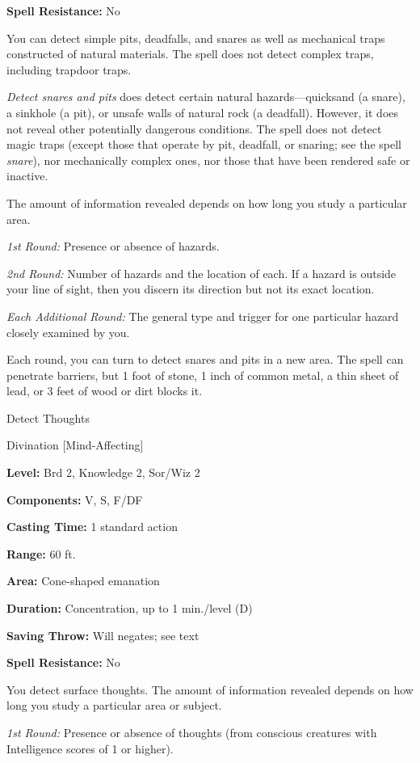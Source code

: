 \documentclass{article}
\begin{document}
\textbf{Spell Resistance:} No

You can detect simple pits, deadfalls, and snares as well as mechanical traps constructed 
of natural materials. The spell does not detect complex traps, including trapdoor 
traps.

\textit{Detect snares and pits }does detect certain natural hazards---quicksand 
(a snare), a sinkhole (a pit), or unsafe walls of natural rock (a deadfall). However, 
it does not reveal other potentially dangerous conditions. The spell does not detect 
magic traps (except those that operate by pit, deadfall, or snaring; see the spell 
\textit{snare}), nor mechanically complex ones, nor those that have been rendered 
safe or inactive.

The amount of information revealed depends on how long you study a particular area.

\textit{1st Round: }Presence or absence of hazards.

\textit{2nd Round: }Number of hazards and the location of each. If a hazard is 
outside your line of sight, then you discern its direction but not its exact location.

\textit{Each Additional Round: }The general type and trigger for one particular 
hazard closely examined by you.

Each round, you can turn to detect snares and pits in a new area. The spell can 
penetrate barriers, but 1 foot of stone, 1 inch of common metal, a thin sheet of 
lead, or 3 feet of wood or dirt blocks it.

\vspace{12pt}
Detect Thoughts

Divination [Mind-Affecting]

\textbf{Level:} Brd 2, Knowledge 2, Sor/Wiz 2

\textbf{Components:} V, S, F/DF

\textbf{Casting Time:} 1 standard action

\textbf{Range:} 60 ft.

\textbf{Area:} Cone-shaped emanation

\textbf{Duration:} Concentration, up to 1 min./level (D)

\textbf{Saving Throw: }Will negates; see text

\textbf{Spell Resistance:} No

You detect surface thoughts. The amount of information revealed depends on how 
long you study a particular area or subject.

\textit{1st Round: }Presence or absence of thoughts (from conscious creatures with 
Intelligence scores of 1 or higher).
\end{document}
